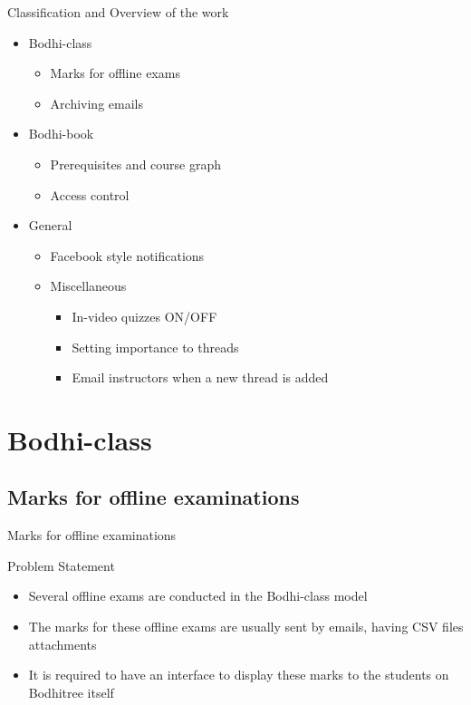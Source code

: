 \documentclass[xcolor=table]{beamer}
\begin{document}
\begin{frame}{Classification and Overview of the work}
	\begin{itemize}
		\item Bodhi-class
		\begin{itemize}
			\item Marks for offline exams
			\item Archiving emails
		\end{itemize}
		\item Bodhi-book
		\begin{itemize}
			\item Prerequisites and course graph
			\item Access control
		\end{itemize}
		\item General
		\begin{itemize}
			\item Facebook style notifications
			\item Miscellaneous
			\begin{itemize}
				\item In-video quizzes ON/OFF
				\item Setting importance to threads
				\item Email instructors when a new thread is added
			\end{itemize}
		\end{itemize}
	\end{itemize}
\end{frame}

\section{Bodhi-class}

\subsection{Marks for offline examinations}

\begin{frame}{Marks for offline examinations}
	\begin{block}{Problem Statement}
		\begin{itemize}
			\item Several offline exams are conducted in the Bodhi-class model
			\item The marks for these offline exams are usually sent by emails, having CSV files attachments
			\item It is required to have an interface to display these marks to the students on Bodhitree itself
		\end{itemize}
	\end{block}
\end{frame}
\end{document}

